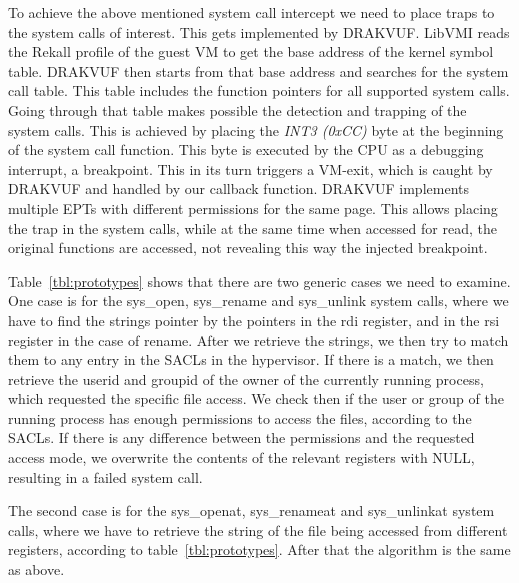 To achieve the above mentioned system call intercept we need to place traps to the system calls of interest. This gets implemented by DRAKVUF. LibVMI reads the Rekall profile of the guest \ac{VM} to get the base address of the kernel symbol table. DRAKVUF then starts from that base address and searches for the system call table. This table includes the function pointers for all supported system calls. Going through that table makes possible the detection and trapping of the system calls. This is achieved by placing the \textit{INT3 (0xCC)} byte at the beginning of the system call function. This byte is executed by the \ac{CPU} as a debugging interrupt, a breakpoint. This in its turn triggers a VM-exit, which is caught by DRAKVUF and handled by our callback function. DRAKVUF implements multiple \ac{EPT}s with different permissions for the same page. This allows placing the trap in the system calls, while at the same time when accessed for read, the original functions are accessed, not revealing this way the injected breakpoint.

\par Table~\ref{tbl:prototypes} shows that there are two generic cases we need to examine. One case is for the sys\_open, sys\_rename and sys\_unlink system calls, where we have to find the strings pointer by the pointers in the rdi register, and in the rsi register in the case of rename. After we retrieve the strings, we then try to match them to any entry in the \ac{SACL}s in the hypervisor. If there is a match, we then retrieve the userid and groupid of the owner of the currently running process, which requested the specific file access. We check then if the user or group of the running process has enough permissions to access the files, according to the \ac{SACL}s. If there is any difference between the permissions and the requested access mode, we overwrite the contents of the relevant registers with NULL, resulting in a failed system call.

\par The second case is for the sys\_openat, sys\_renameat and sys\_unlinkat system calls, where we have to retrieve the string of the file being accessed from different registers, according to table~\ref{tbl:prototypes}. After that the algorithm is the same as above.


